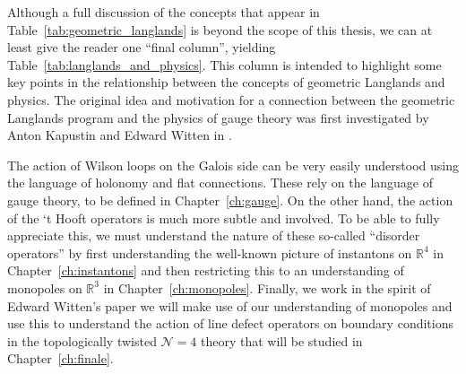 Although a full discussion of the concepts that appear in Table~\ref{tab:geometric_langlands} is beyond the scope of this thesis, we can at least give the reader one ``final column'', yielding Table~\ref{tab:langlands_and_physics}. This column is intended to highlight some key points in the relationship between the concepts of geometric Langlands and physics. The original idea and motivation for a connection between the geometric Langlands program and the physics of gauge theory was first investigated by Anton Kapustin and Edward Witten in \cite{kapustin2006}.


The action of Wilson loops on the Galois side can be very easily understood using the language of holonomy and flat connections. These rely on the language of gauge theory, to be defined in Chapter~\ref{ch:gauge}. On the other hand, the action of the `t Hooft operators is much more subtle and involved. To be able to fully appreciate this, we must understand the nature of these so-called ``disorder operators'' by first understanding the well-known picture of instantons on $\mathbb R^4$ in Chapter~\ref{ch:instantons} and then restricting this to an understanding of monopoles on $\mathbb R^3$ in Chapter~\ref{ch:monopoles}. Finally, we work in the spirit of Edward Witten's paper \cite{witten2010nahm} we will make use of our understanding of monopoles and use this to understand the action of line defect operators on boundary conditions in the topologically twisted $\mathcal N=4$ theory that will be studied in Chapter~\ref{ch:finale}. 

